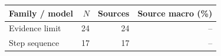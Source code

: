 \begin{tabular}{lrrr}
\toprule
Family / model & $N$ & Sources & Source macro (\%) \\
\midrule
Evidence limit & 24 & 24 & -- \\
Step sequence & 17 & 17 & -- \\
\bottomrule
\end{tabular}
